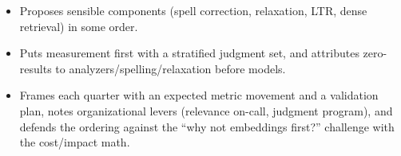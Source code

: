 \begin{interviewq}

\goodgreat
\begin{itemize}
    \item {} Proposes sensible components (spell correction, relaxation, LTR, dense retrieval) in some order.
    \item {} Puts measurement first with a stratified judgment set, and attributes zero-results to analyzers/spelling/relaxation before models.
    \item {} Frames each quarter with an expected metric movement and a validation plan, notes organizational levers (relevance on-call, judgment program), and defends the ordering against the ``why not embeddings first?'' challenge with the cost/impact math.
\end{itemize}

\end{interviewq}


